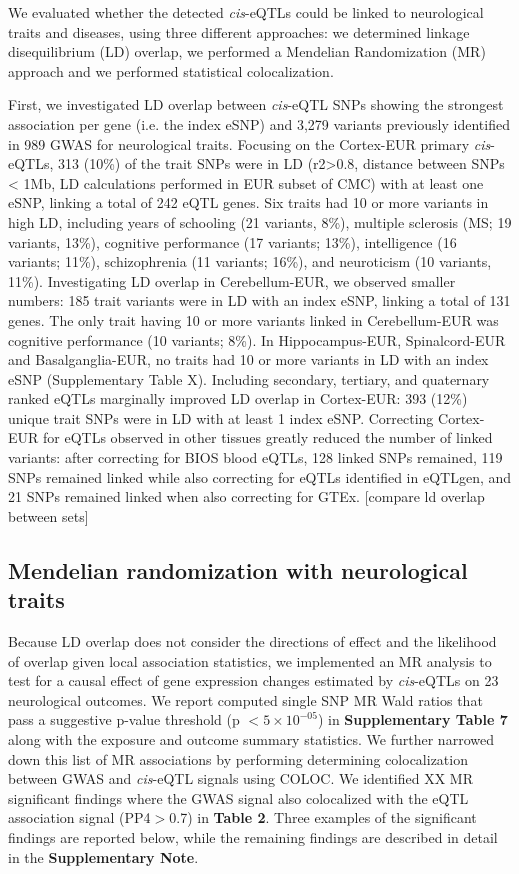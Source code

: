 We evaluated whether the detected \emph{cis}-eQTLs could be linked to neurological traits and diseases, using three different approaches: we determined linkage disequilibrium (LD) overlap, we performed a Mendelian Randomization (MR) approach and we performed statistical colocalization. 

First, we investigated LD overlap between \emph{cis}-eQTL SNPs showing the strongest association per gene (i.e. the index eSNP) and 3,279 variants previously identified in 989 GWAS for neurological traits. Focusing on the Cortex-EUR primary \emph{cis}-eQTLs, 313 (10\%) of the trait SNPs were in LD (r2>0.8, distance between SNPs < 1Mb, LD calculations performed in EUR subset of CMC) with at least one eSNP, linking a total of 242 eQTL genes. Six traits had 10 or more variants in high LD, including years of schooling (21 variants, 8\%), multiple sclerosis (MS; 19 variants, 13\%), cognitive performance (17 variants; 13\%), intelligence (16 variants; 11\%), schizophrenia (11 variants; 16\%), and neuroticism (10 variants, 11\%). Investigating LD overlap in Cerebellum-EUR, we observed smaller numbers: 185 trait variants were in LD with an index eSNP, linking a total of 131 genes. The only trait having 10 or more variants linked in Cerebellum-EUR was cognitive performance (10 variants; 8\%). In Hippocampus-EUR, Spinalcord-EUR and Basalganglia-EUR, no traits had 10 or more variants in LD with an index eSNP (Supplementary Table X). Including secondary, tertiary, and quaternary ranked eQTLs marginally improved LD overlap in Cortex-EUR: 393 (12\%) unique trait SNPs were in LD with at least 1 index eSNP. Correcting Cortex-EUR for eQTLs observed in other tissues greatly reduced the number of linked variants: after correcting for BIOS blood eQTLs, 128 linked SNPs remained, 119 SNPs remained linked while also correcting for eQTLs identified in eQTLgen, and 21 SNPs remained linked when also correcting for GTEx. [compare ld overlap between sets] 

\subsection{Mendelian randomization with neurological traits}
Because LD overlap does not consider the directions of effect and the likelihood of overlap given local association statistics, we implemented an MR analysis to test for a causal effect of gene expression changes estimated by \emph{cis}-eQTLs on 23 neurological outcomes. We report computed single SNP MR Wald ratios that pass a suggestive p-value threshold (p $< 5 \times 10^{-05}$) in \textbf{Supplementary Table 7} along with the exposure and outcome summary statistics. We further narrowed down this list of MR associations by performing determining colocalization between GWAS and \emph{cis}-eQTL signals using COLOC\cite{BayesianTestColocalisation}. We identified XX MR significant findings where the GWAS signal also colocalized with the eQTL association signal (PP4$>$0.7) in \textbf{Table 2}. Three examples of the significant findings are reported below, while the remaining findings are described in detail in the \textbf{Supplementary Note}. 

